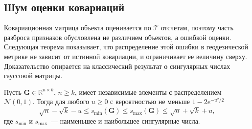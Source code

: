 \subsection{Шум оценки ковариаций}\label{sec3:cls_theory_noise}

Ковариационная матрица объекта оценивается по $\mathcal{T}$ отсчетам, поэтому часть разброса признаков обусловлена не различием объектов, а ошибкой оценки. Следующая теорема показывает, что распределение этой ошибки в геодезической метрике не зависит от истинной ковариации, и ограничивает ее величину сверху. Доказательство опирается на классический результат о сингулярных числах гауссовой матрицы.

\begin{proposition}\label{prop:cls_vershynin}
Пусть $\mathbf{G} \in \mathbb{R}^{n \times k}$, $n \geqslant k$, имеет независимые элементы с распределением $\mathcal{N}(0,1)$. Тогда для любого $u \geqslant 0$ с вероятностью не меньше $1 - 2e^{-u^2/2}$
\begin{equation*}\sqrt{n} - \sqrt{k} - u \leqslant s_{\min}(\mathbf{G}) \leqslant s_{\max}(\mathbf{G}) \leqslant \sqrt{n} + \sqrt{k} + u ,
\end{equation*}
где $s_{\min}$ и $s_{\max}$~--- наименьшее и наибольшее сингулярные числа.
\end{proposition}

